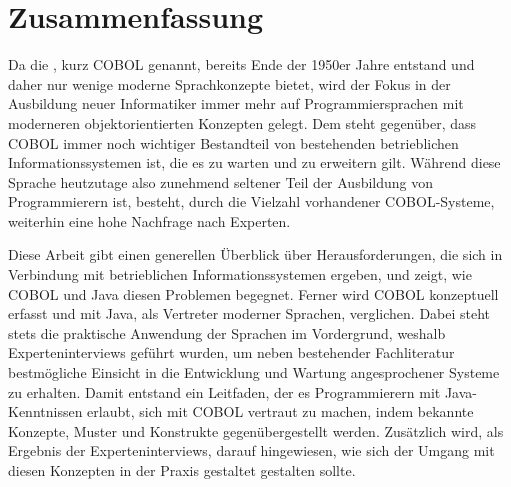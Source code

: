 \chapter*{Zusammenfassung} 

Da die , kurz \mbox{COBOL} genannt, bereits Ende der 1950er Jahre entstand und daher nur wenige moderne Sprachkonzepte bietet, wird der Fokus in der Ausbildung neuer Informatiker immer mehr auf Programmiersprachen mit moderneren objektorientierten Konzepten gelegt. Dem steht gegenüber, dass COBOL immer noch wichtiger Bestandteil von bestehenden betrieblichen Informationssystemen ist, die es zu warten und zu erweitern gilt. Während diese Sprache heutzutage also zunehmend seltener Teil der Ausbildung von Programmierern ist, besteht, durch die Vielzahl vorhandener COBOL-Systeme, weiterhin eine hohe Nachfrage nach Experten.

Diese Arbeit gibt einen generellen Überblick über Herausforderungen, die sich in Verbindung mit betrieblichen Informationssystemen ergeben, und zeigt, wie COBOL und Java diesen Problemen begegnet. Ferner wird COBOL konzeptuell erfasst und mit Java, als Vertreter moderner Sprachen, verglichen. Dabei steht stets die praktische Anwendung der Sprachen im Vordergrund, weshalb Experteninterviews geführt wurden, um neben bestehender Fachliteratur bestmögliche Einsicht in die Entwicklung und Wartung angesprochener Systeme zu erhalten. Damit entstand ein Leitfaden, der es Programmierern mit Java-Kenntnissen erlaubt, sich mit COBOL vertraut zu machen, indem bekannte Konzepte, Muster und Konstrukte gegenübergestellt werden. Zusätzlich wird, als Ergebnis der Experteninterviews, darauf hingewiesen, wie sich der Umgang mit diesen Konzepten in der Praxis gestaltet \bzw gestalten sollte. 